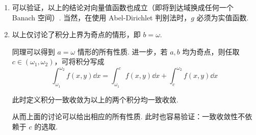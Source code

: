 \begin{hint}
    \begin{enumerate}
        \item 可以验证，以上的结论对向量值函数也成立（即将到达域换成任何一个 Banach 空间）. 当然，在使用 Abel-Dirichlet 判别法时，$g$ 必须为实值函数.
        
        \item 以上仅讨论了积分上界为奇点的情形，即 $b=\omega$.
        
        同理可以得到 $a=\omega$ 情形的所有性质. 进一步，若 $a,b$ 均为奇点，则任取 $c\in(\omega_1,\omega_2)$，可将积分写成
$$
\int_{\omega_1}^{\omega_2}f(x,y)\dd x=\int_{\omega_1}^cf(x,y)\dd x+\int_c^{\omega_2}f(x,y)\dd x
$$

        此时定义积分一致收敛为以上的两个积分均一致收敛.

        从而上面的讨论可以给出相应的所有性质. 此时也容易验证：一致收敛性不依赖于 $c$ 的选取.
    \end{enumerate}
\end{hint}


